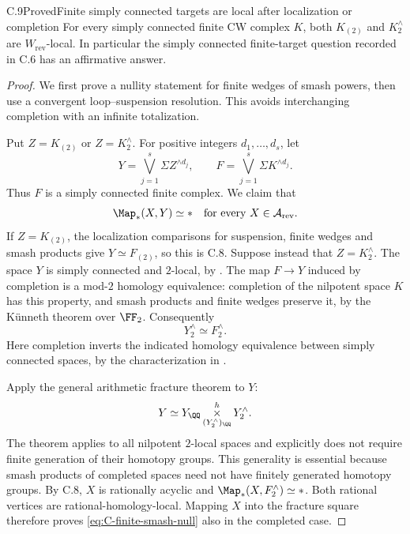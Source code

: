 \begin{claim}{C.9}{Proved}{Finite simply connected targets are local after localization or completion}
For every simply connected finite CW complex $K$, both $K_{(2)}$ and $K^{\wedge}_2$ are $W_{\mathrm{rev}}$-local. In particular the simply connected finite-target question recorded in C.6 has an affirmative answer.
\end{claim}
\begin{proof}
We first prove a nullity statement for finite wedges of smash powers, then use a convergent loop--suspension resolution. This avoids interchanging completion with an infinite totalization.

Put $Z=K_{(2)}$ or $Z=K^{\wedge}_2$. For positive integers $d_1,\ldots,d_s$, let
\[
 Y=\bigvee_{j=1}^s\Sigma Z^{\wedge d_j},
 \qquad
 F=\bigvee_{j=1}^s\Sigma K^{\wedge d_j}.
\]
Thus $F$ is a simply connected finite complex. We claim that
\begin{equation}\label{eq:C-finite-smash-null}
 \Map_*(X,Y)\simeq *\quad
 \text{for every }X\in\mathcal A_{\mathrm{rev}}.
\end{equation}
If $Z=K_{(2)}$, the localization comparisons for suspension, finite wedges and smash products give $Y\simeq F_{(2)}$, so this is C.8. Suppose instead that $Z=K^{\wedge}_2$. The space $Y$ is simply connected and $2$-local, by \cite[Propositions 6.4.1, 6.4.2 and 6.4.6]{FGHMayPonto2012}. The map $F\to Y$ induced by completion is a mod-$2$ homology equivalence: completion of the nilpotent space $K$ has this property, and smash products and finite wedges preserve it, by the K\"unneth theorem over $\FF_2$. Consequently
\[
 Y^{\wedge}_2\simeq F^{\wedge}_2.
\]
Here completion inverts the indicated homology equivalence between simply connected spaces, by the characterization in \cite[Theorems 11.1.1--11.1.2]{FGHMayPonto2012}.

Apply the general arithmetic fracture theorem
\cite[Theorem 13.1.4, p.~244]{FGHMayPonto2012} to $Y$:
\[
 Y\simeq Y_{\QQ}\mathop{\times}\limits^h_{(Y^{\wedge}_2)_{\QQ}}
                  Y^{\wedge}_2.
\]
The theorem applies to all nilpotent $2$-local spaces and explicitly does not require finite generation of their homotopy groups. This generality is essential because smash products of completed spaces need not have finitely generated homotopy groups. By C.8, $X$ is rationally acyclic and $\Map_*(X,F^{\wedge}_2)\simeq *$. Both rational vertices are rational-homology-local. Mapping $X$ into the fracture square therefore proves \eqref{eq:C-finite-smash-null} also in the completed case.


\end{proof}
